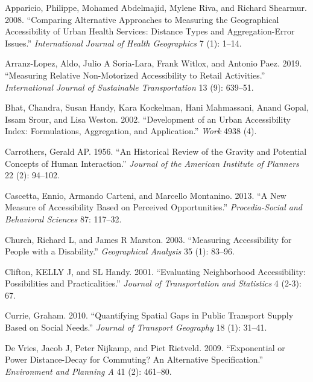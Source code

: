 \documentclass[preprint, 3p,
authoryear]{elsarticle} %
\newlength{\cslhangindent}
\newlength{\cslentryspacingunit} %
\newenvironment{CSLReferences}[2] %
 {%
  \setlength{\parindent}{0pt}
  \ifodd #1
  \let\oldpar\par
  \def\par{\hangindent=\cslhangindent\oldpar}
  \fi
  \setlength{\parskip}{#2\cslentryspacingunit}
 }%
 {}
\begin{document}
\hypertarget{refs}{}
\begin{CSLReferences}{1}{0}
\leavevmode{}%
Apparicio, Philippe, Mohamed Abdelmajid, Mylene Riva, and Richard
Shearmur. 2008. {``Comparing Alternative Approaches to Measuring the
Geographical Accessibility of Urban Health Services: Distance Types and
Aggregation-Error Issues.''} \emph{International Journal of Health
Geographics} 7 (1): 1--14.

\leavevmode{}%
Arranz-Lopez, Aldo, Julio A Soria-Lara, Frank Witlox, and Antonio Paez.
2019. {``Measuring Relative Non-Motorized Accessibility to Retail
Activities.''} \emph{International Journal of Sustainable
Transportation} 13 (9): 639--51.

\leavevmode{}%
Bhat, Chandra, Susan Handy, Kara Kockelman, Hani Mahmassani, Anand
Gopal, Issam Srour, and Lisa Weston. 2002. {``Development of an Urban
Accessibility Index: Formulations, Aggregation, and Application.''}
\emph{Work} 4938 (4).

\leavevmode{}%
Carrothers, Gerald AP. 1956. {``An Historical Review of the Gravity and
Potential Concepts of Human Interaction.''} \emph{Journal of the
American Institute of Planners} 22 (2): 94--102.

\leavevmode{}%
Cascetta, Ennio, Armando Carteni, and Marcello Montanino. 2013. {``A New
Measure of Accessibility Based on Perceived Opportunities.''}
\emph{Procedia-Social and Behavioral Sciences} 87: 117--32.

\leavevmode{}%
Church, Richard L, and James R Marston. 2003. {``Measuring Accessibility
for People with a Disability.''} \emph{Geographical Analysis} 35 (1):
83--96.

\leavevmode{}%
Clifton, KELLY J, and SL Handy. 2001. {``Evaluating Neighborhood
Accessibility: Possibilities and Practicalities.''} \emph{Journal of
Transportation and Statistics} 4 (2-3): 67.

\leavevmode{}%
Currie, Graham. 2010. {``Quantifying Spatial Gaps in Public Transport
Supply Based on Social Needs.''} \emph{Journal of Transport Geography}
18 (1): 31--41.

\leavevmode{}%
De Vries, Jacob J, Peter Nijkamp, and Piet Rietveld. 2009.
{``Exponential or Power Distance-Decay for Commuting? An Alternative
Specification.''} \emph{Environment and Planning A} 41 (2): 461--80.


\end{CSLReferences}
\end{document}
